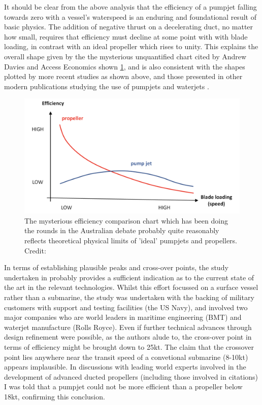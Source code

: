\documentclass{article}\usepackage[]{graphicx}\usepackage[]{color}
\begin{document}
It should be clear from the above analysis that the efficiency of a pumpjet falling towards zero with a vessel's waterspeed is an enduring and foundational result of basic physics.  The addition of negative thrust on a decelerating duct, no matter how small, requires that efficiency must decline at some point with with blade loading, in contrast with an ideal propeller which rises to unity.  This explains the overall shape given by the the mysterious unquantified chart cited by Andrew Davies \parencite{davies2017} and Access Economics \parencite{stanford2017} shown \ref{fig:PumpUp.png}, and is also consistent with the shapes plotted by more recent studies as shown above, and those presented in other modern publications studying the use of pumpjets \parencite{giles2010} and waterjets \parencite{fujisawa1995}.

\begin{figure}
\includegraphics[width=\textwidth]{PumpUp.png}
\caption{The mysterious efficiency comparison chart which has been doing the rounds in the Australian debate probably quite reasonably reflects theoretical physical limits of 'ideal' pumpjets and propellers. Credit: \cite{stanford2017}}
\label{fig:PumpUp.png}
\end{figure}

In terms of establishing plausible peaks and cross-over points, the study undertaken in \cite{giles2010} probably provides a sufficient indication as to the current state of the art in the relevant technologies.  Whilst this effort focussed on a surface vessel rather than a submarine, the study was undertaken with the backing of military customers with support and testing facilities (the US Navy), and involved two major companies who are world leaders in maritime engineering (BMT) and waterjet manufacture (Rolls Royce). Even if further technical advances through design refinement were possible, as the authors alude to, the cross-over point in terms of efficiency might be brought down to 25kt.  The claim that the crossover point lies anywhere near the transit speed of a convetional submarine (8-10kt) appears implausible. In discussions with leading world experts involved in the development of advanced ducted propellers (including those involved in citations) I was told that a pumpjet could not be more efficient than a propeller below 18kt, confirming this conclusion.
\end{document}
